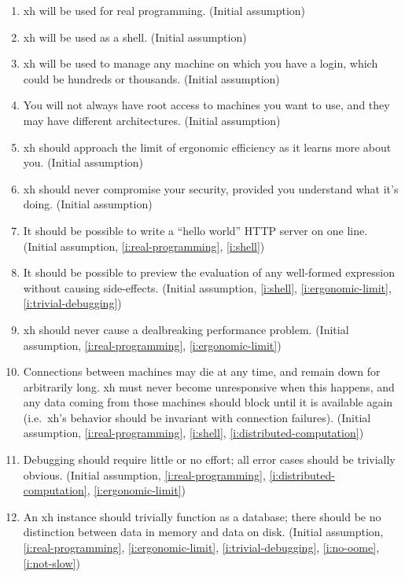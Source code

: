 \documentclass{report}
\begin{document}
\begin{enumerate}
\item{}\label{i:real-programming}
  xh will be used for real programming.
    (Initial assumption)
\item{}\label{i:shell}
  xh will be used as a shell.
    (Initial assumption)
\item{}\label{i:distributed-computation}
  xh will be used to manage any machine on which you have a login, which
  could be hundreds or thousands.
    (Initial assumption)
\item{}\label{i:no-root-access}
  You will not always have root access to machines you want to use, and
  they may have different architectures.
    (Initial assumption)
\item{}\label{i:ergonomic-limit}
  xh should approach the limit of ergonomic efficiency as it learns more
  about you.
    (Initial assumption)
\item{}\label{i:security}
  xh should never compromise your security, provided you understand what
  it's doing.
    (Initial assumption)

\item{}\label{i:quick-webserver}
  It should be possible to write a ``hello world'' HTTP server on one line.
    (Initial assumption,
     \ref{i:real-programming},
     \ref{i:shell})
\item{}\label{i:live-preview}
  It should be possible to preview the evaluation of any well-formed
  expression without causing side-effects.
    (Initial assumption,
     \ref{i:shell},
     \ref{i:ergonomic-limit},
     \ref{i:trivial-debugging})
\item{}\label{i:not-slow}
  xh should never cause a dealbreaking performance problem.
    (Initial assumption,
     \ref{i:real-programming},
     \ref{i:ergonomic-limit})
\item{}\label{i:unreliable-connections}
  Connections between machines may die at any time, and remain down for
  arbitrarily long. xh must never become unresponsive when this happens,
  and any data coming from those machines should block until it is
  available again (i.e.~xh's behavior should be invariant with connection
  failures).
    (Initial assumption,
     \ref{i:real-programming},
     \ref{i:shell},
     \ref{i:distributed-computation})
\item{}\label{i:trivial-debugging}
  Debugging should require little or no effort; all error cases should be
  trivially obvious.
    (Initial assumption,
     \ref{i:real-programming},
     \ref{i:distributed-computation},
     \ref{i:ergonomic-limit})
\item{}\label{i:trivial-database}
  An xh instance should trivially function as a database; there should be
  no distinction between data in memory and data on disk.
    (Initial assumption,
     \ref{i:real-programming},
     \ref{i:ergonomic-limit},
     \ref{i:trivial-debugging},
     \ref{i:no-oome},
     \ref{i:not-slow})


\end{enumerate}
\end{document}
